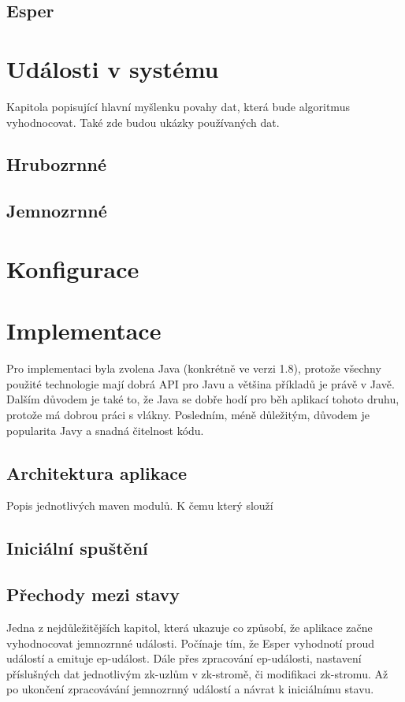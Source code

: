 \documentclass[
  digital, %
  table,   %
  nolof,     %
  nolot,     %
  twoside,
  nocover,
  monochrome,
  12pt
]{fithesis3}
\begin{document}
\subsection{Esper}
\section{Události v systému}
\label{sec:udalosti-v-systemu}
Kapitola popisující hlavní myšlenku povahy dat, která bude algoritmus vyhodnocovat. Také zde budou ukázky používaných dat.
\subsection{Hrubozrnné}
\subsection{Jemnozrnné}
\section{Konfigurace}
\section{Implementace}
Pro implementaci byla zvolena Java (konkrétně ve verzi 1.8), protože všechny použité technologie mají dobrá API pro Javu a většina příkladů je právě v Javě. Dalším důvodem je také to, že Java se dobře hodí pro běh aplikací tohoto druhu, protože má dobrou práci s vlákny. Posledním, méně důležitým, důvodem je popularita Javy a snadná čitelnost kódu.
\subsection{Architektura aplikace}
Popis jednotlivých maven modulů. K čemu který slouží
\subsection{Iniciální spuštění}
\subsection{Přechody mezi stavy}
Jedna z nejdůležitějších kapitol, která ukazuje co způsobí, že aplikace začne vyhodnocovat jemnozrnné události. Počínaje tím, že Esper vyhodnotí proud událostí a emituje ep-událost. Dále přes zpracování ep-události, nastavení příslušných dat jednotlivým zk-uzlům v zk-stromě, či modifikaci zk-stromu. Až po ukončení zpracovávání jemnozrnný událostí a návrat k iniciálnímu stavu.
\end{document}
